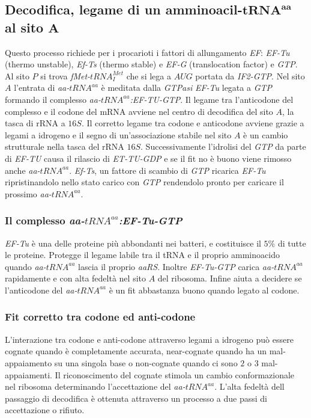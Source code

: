 \subsection{Decodifica, legame di un amminoacil-$\mathbf{tRNA^{aa}}$ al sito $\mathbf{A}$}
Questo processo richiede per i procarioti i fattori di allungamento \emph{EF}: \emph{EF-Tu} (thermo unstable), \emph{Ef-Ts} (thermo stable) e \emph{EF-G} (translocation factor) e \emph{GTP}. Al sito 
$P$ si trova \emph{fMet-$tRNA_I^{Met}$} che si lega a $AUG$ portata da \emph{IF2-GTP}. Nel sito $A$ l'entrata di \emph{aa-$tRNA^{aa}$} \`e meditata dalla \emph{GTPasi} \emph{EF-Tu} legata a 
\emph{GTP} formando il complesso \emph{aa-$tRNA^{aa}$:EF-TU-GTP}. Il legame tra l'anticodone del complesso e il codone del mRNA avviene nel centro di decodifica del sito $A$, la tasca di rRNA a $16S$. 
Il corretto legame tra codone e anticodone avviene grazie a legami a idrogeno e il segno di un'associazione stabile nel sito $A$ \`e un cambio strutturale nella tasca del rRNA $16S$. Successivamente
l'idrolisi del \emph{GTP} da parte di \emph{EF-TU} causa il rilascio di \emph{ET-TU-GDP} e se il fit no \`e buono viene rimosso anche \emph{aa-$tRNA^{aa}$}. \emph{Ef-Ts}, un fattore di scambio di 
\emph{GTP} ricarica \emph{EF-Tu} ripristinandolo nello stato carico con \emph{GTP} rendendolo pronto per caricare il prossimo \emph{aa-$tRNA^{aa}$}. 
\subsubsection{Il complesso \emph{aa-$tRNA^{aa}$:EF-Tu-GTP}}
\emph{EF-Tu} \`e una delle proteine pi\`u abbondanti nei batteri, e costituisce il $5\%$ di tutte le proteine. Protegge il legame labile tra il tRNA e il proprio amminoacido quando
\emph{aa-$tRNA^{aa}$} lascia il proprio \emph{aaRS}. Inoltre \emph{EF-Tu-GTP} carica \emph{aa-$tRNA^{aa}$} rapidamente e con alta fedelt\`a nel sito $A$ del ribosoma. Infine 
aiuta a decidere se l'anticodone del \emph{aa-$tRNA^{aa}$} \`e un fit abbastanza buono quando legato al codone. 
\subsubsection{Fit corretto tra codone ed anti-codone}
L'interazione tra codone e anti-codone attraverso legami a idrogeno pu\`o essere cognate quando \`e completamente accurata, near-cognate quando ha un mal-appaiamento su una singola 
base o non-cognate quando ci sono $2$ o $3$ mal-appaiamenti. Il riconoscimento del cognate stimola un cambio conformazionale nel ribosoma determinando l'accettazione del 
\emph{aa-$tRNA^{aa}$}. L'alta fedelt\`a dell passaggio di decodifica \`e ottenuta attraverso un processo a due passi di accettazione o rifiuto. 
